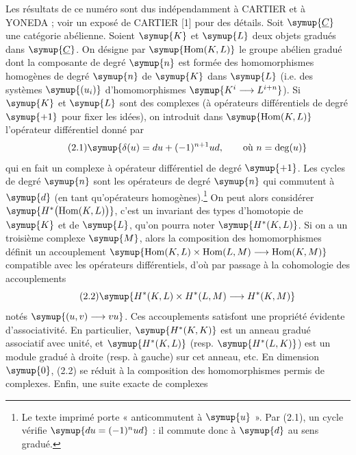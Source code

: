 Les résultats de ce numéro sont dus indépendamment à CARTIER et à YONEDA ; voir
un exposé de CARTIER [1] pour des détails. Soit $\symup{\underline{C}}$ une catégorie abélienne.
Soient $\symup{K}$ et $\symup{L}$ deux objets gradués dans $\symup{\underline{C}}$. On désigne par
$\symup{\operatorname{Hom}(K,L)}$ le groupe abélien gradué dont la composante de degré
$\symup{n}$ est formée des homomorphismes homogènes de degré $\symup{n}$ de $\symup{K}$ dans $\symup{L}$ (i.e.
des systèmes $\symup{(u_i)}$ d'homomorphismes $\symup{K^{i}\longrightarrow L^{i+n}}$).
Si $\symup{K}$ et $\symup{L}$ sont des complexes (à opérateurs différentiels de degré $\symup{+1}$ pour
fixer les idées), on introduit dans $\symup{\operatorname{Hom}(K,L)}$ l'opérateur
différentiel donné par
\begin{equation}\tag{2.1}
  \symup{\delta(u)=du+(-1)^{n+1}ud,\qquad\text{où }n=\deg(u)}
\end{equation}
qui en fait un complexe à opérateur différentiel de degré $\symup{+1}$. Les cycles de
degré $\symup{n}$ sont les opérateurs de degré $\symup{n}$ qui commutent à $\symup{d}$ (en tant
qu'opérateurs homogènes).\footnote{Le texte imprimé porte « anticommutent à $\symup{u}$ ». Par (2.1), un cycle vérifie $\symup{du=(-1)^nud}$ : il commute donc à $\symup{d}$ au sens gradué.} On peut alors considérer
$\symup{H^{*}\bigl(\operatorname{Hom}(K,L)\bigr)}$, c'est un invariant des types
d'homotopie de $\symup{K}$ et de $\symup{L}$, qu'on pourra noter $\symup{H^{*}(K,L)}$.
Si on a un troisième complexe $\symup{M}$, alors la composition des homomorphismes
définit un accouplement
$\symup{\operatorname{Hom}(K,L)\times\operatorname{Hom}(L,M)
\longrightarrow\operatorname{Hom}(K,M)}$ compatible avec les opérateurs différentiels, d'où par passage à la cohomologie
des accouplements
\begin{equation}\tag{2.2}
  \symup{H^{*}(K,L)\times H^{*}(L,M)\longrightarrow H^{*}(K,M)}
\end{equation}
notés $\symup{(u,v)\longrightarrow vu}$. Ces accouplements satisfont une propriété évidente
d'associativité. En particulier, $\symup{H^{*}(K,K)}$ est un anneau gradué associatif
avec unité, et $\symup{H^{*}(K,L)}$ (resp. $\symup{H^{*}(L,K)}$) est un module gradué à droite
(resp. à gauche) sur cet anneau, etc. En dimension $\symup{0}$, (2.2) se réduit à la
composition des homomorphismes permis de complexes. Enfin, une suite exacte de
complexes
